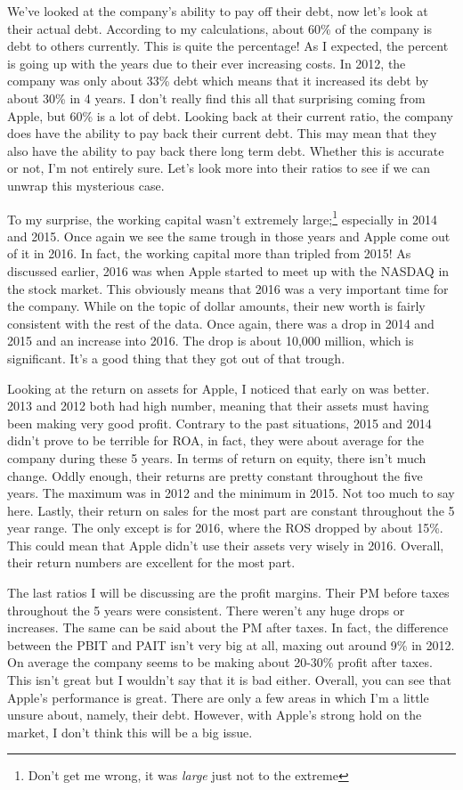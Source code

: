 \documentclass[12pt,a4paper,titlepage]{article}
\begin{document}
We've looked at the company's ability to pay off their debt, now let's look at
their actual debt. According to my calculations, about 60\% of the company is
debt to others currently. This is quite the percentage! As I expected, the
percent is going up with the years due to their ever increasing costs. In 2012,
the company was only about 33\% debt which means that it increased its debt by
about 30\% in 4 years. I don't really find this all that surprising coming from
Apple, but 60\% is a lot of debt. Looking back at their current ratio, the
company does have the ability to pay back their current debt. This may mean that
they also have the ability to pay back there long term debt. Whether this is
accurate or not, I'm not entirely sure. Let's look more into their ratios to see
if we can unwrap this mysterious case.

To my surprise, the working capital wasn't extremely large;\footnote{Don't get
  me wrong, it was \emph{large} just not to the extreme} especially in 2014 and
2015. Once again we see the same trough in those years and Apple come out of it
in 2016. In fact, the working capital more than tripled from 2015! As discussed
earlier, 2016 was when Apple started to meet up with the NASDAQ in the stock
market. This obviously means that 2016 was a very important time for the
company. While on the topic of dollar amounts, their new worth is fairly
consistent with the rest of the data. Once again, there was a drop in 2014 and
2015 and an increase into 2016. The drop is about 10,000 million, which is
significant. It's a good thing that they got out of that trough.

Looking at the return on assets for Apple, I noticed that early on was
better. 2013 and 2012 both had high number, meaning that their assets must
having been making very good profit. Contrary to the past situations, 2015 and
2014 didn't prove to be terrible for ROA, in fact, they were about average for
the company during these 5 years. In terms of return on equity, there isn't much
change. Oddly enough, their returns are pretty constant throughout the five
years. The maximum was in 2012 and the minimum in 2015. Not too much to say
here. Lastly, their return on sales for the most part are constant throughout
the 5 year range. The only except is for 2016, where the ROS dropped by about
15\%. This could mean that Apple didn't use their assets very wisely in
2016. Overall, their return numbers are excellent for the most part.

The last ratios I will be discussing are the profit margins. Their PM before
taxes throughout the 5 years were consistent. There weren't any huge drops or
increases. The same can be said about the PM after taxes. In fact, the
difference between the PBIT and PAIT isn't very big at all, maxing out around
9\% in 2012. On average the company seems to be making about 20-30\% profit
after taxes. This isn't great but I wouldn't say that it is bad
either. Overall, you can see that Apple's performance is great. There are only a
few areas in which I'm a little unsure about, namely, their debt. However, with
Apple's strong hold on the market, I don't think this will be a big issue.
\end{document}
